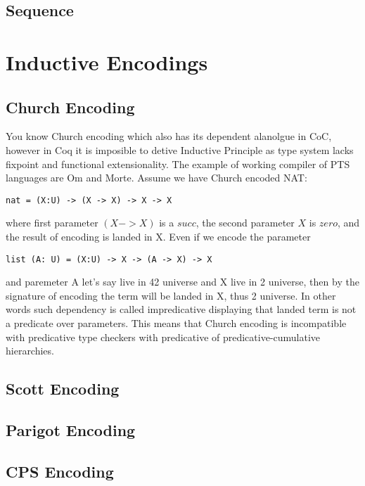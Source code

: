 \documentclass{article}
\theoremstyle{definition}
\begin{document}
\subsection{Sequence}

\newpage
\section{Inductive Encodings}

\subsection{Church Encoding}

You know Church encoding which also has its dependent alanolgue in CoC, however
in Coq it is imposible to detive Inductive Principle as type system lacks fixpoint
and functional extensionality. The example of working compiler of PTS languages are Om and Morte.
Assume we have Church encoded NAT:

\begin{lstlisting}[mathescape=true]
nat = (X:U) -> (X -> X) -> X -> X
\end{lstlisting}

where first parameter $(X -> X)$ is a $succ$, the second parameter $X$ is $zero$,
and the result of encoding is landed in X. Even if we encode the parameter

\begin{lstlisting}[mathescape=true]
list (A: U) = (X:U) -> X -> (A -> X) -> X
\end{lstlisting}

and paremeter A let's say live in 42 universe and X live in 2 universe, then by
the signature of encoding the term will be landed in X, thus 2 universe. In other words
such dependency is called impredicative displaying that landed term is not a predicate over parameters.
This means that Church encoding is incompatible with predicative type checkers with predicative
of predicative-cumulative hierarchies.


\subsection{Scott Encoding}

\subsection{Parigot Encoding}

\subsection{CPS Encoding}
\end{document}
